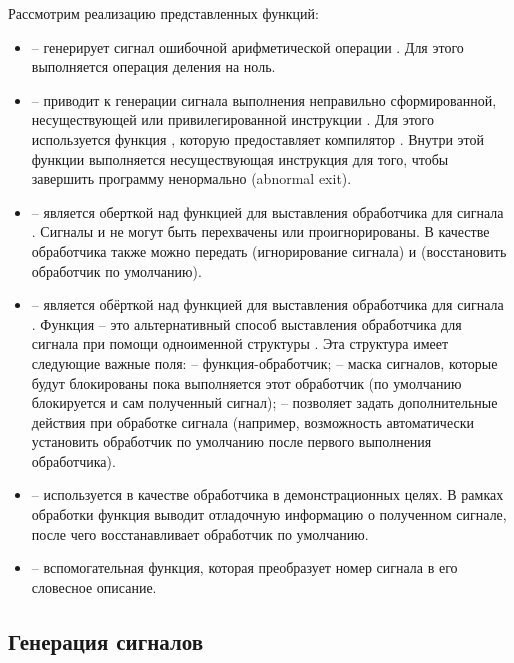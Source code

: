 Рассмотрим реализацию представленных функций:
\begin{itemize}
	\item {} -- генерирует сигнал ошибочной арифметической операции . Для этого выполняется операция деления на ноль.
	\item {} -- приводит к генерации сигнала выполнения неправильно сформированной, несуществующей или привилегированной инструкции . Для этого используется функция , которую предоставляет компилятор . Внутри этой функции выполняется несуществующая инструкция для того, чтобы завершить программу ненормально (abnormal exit).
	\item {} -- является оберткой над функцией  для выставления обработчика  для сигнала . Сигналы  и  не могут быть перехвачены или проигнорированы. В качестве обработчика также можно передать  (игнорирование сигнала) и  (восстановить обработчик по умолчанию).
	\item {} -- является обёрткой над функцией  для выставления обработчика  для сигнала . Функция  -- это альтернативный способ выставления обработчика для сигнала при помощи одноименной структуры . Эта структура имеет следующие важные поля:  -- функция-обработчик;  -- маска сигналов, которые
	будут блокированы пока выполняется этот обработчик (по умолчанию блокируется и сам полученный сигнал);  -- позволяет задать дополнительные действия при обработке сигнала (например, возможность автоматически установить обработчик по умолчанию после первого выполнения обработчика).
	\item {} -- используется в качестве обработчика в демонстрационных целях. В рамках обработки функция выводит отладочную информацию о полученном сигнале, после чего восстанавливает обработчик по умолчанию.
	\item {} -- вспомогательная функция, которая преобразует номер сигнала в его словесное описание.
\end{itemize}

\subsection{Генерация сигналов}

